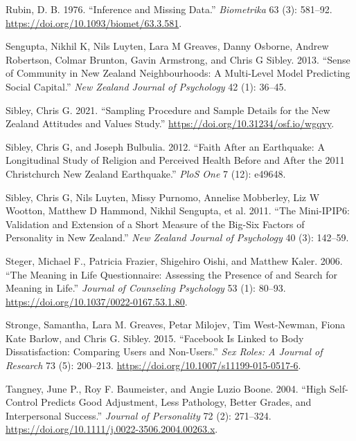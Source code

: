 \documentclass[
  singlecolumn]{report}
\newlength{\cslhangindent}
\newlength{\cslentryspacingunit} %
\newenvironment{CSLReferences}[2] %
 {%
  \setlength{\parindent}{0pt}
  \ifodd #1
  \let\oldpar\par
  \def\par{\hangindent=\cslhangindent\oldpar}
  \fi
  \setlength{\parskip}{#2\cslentryspacingunit}
 }%
 {}
\begin{document}
\begin{CSLReferences}{1}{0}
\leavevmode{}%
Rubin, D. B. 1976. {``Inference and Missing Data.''} \emph{Biometrika}
63 (3): 581--92. \url{https://doi.org/10.1093/biomet/63.3.581}.

\leavevmode{}%
Sengupta, Nikhil K, Nils Luyten, Lara M Greaves, Danny Osborne, Andrew
Robertson, Colmar Brunton, Gavin Armstrong, and Chris G Sibley. 2013.
{``Sense of Community in New Zealand Neighbourhoods: A Multi-Level Model
Predicting Social Capital.''} \emph{New Zealand Journal of Psychology}
42 (1): 36--45.

\leavevmode{}%
Sibley, Chris G. 2021. {``Sampling Procedure and Sample Details for the
New Zealand Attitudes and Values Study.''}
\url{https://doi.org/10.31234/osf.io/wgqvy}.

\leavevmode{}%
Sibley, Chris G, and Joseph Bulbulia. 2012. {``Faith After an
Earthquake: A Longitudinal Study of Religion and Perceived Health Before
and After the 2011 Christchurch New Zealand Earthquake.''} \emph{PloS
One} 7 (12): e49648.

\leavevmode{}%
Sibley, Chris G, Nils Luyten, Missy Purnomo, Annelise Mobberley, Liz W
Wootton, Matthew D Hammond, Nikhil Sengupta, et al. 2011. {``The
Mini-IPIP6: Validation and Extension of a Short Measure of the Big-Six
Factors of Personality in New Zealand.''} \emph{New Zealand Journal of
Psychology} 40 (3): 142--59.

\leavevmode{}%
Steger, Michael F., Patricia Frazier, Shigehiro Oishi, and Matthew
Kaler. 2006. {``The Meaning in Life Questionnaire: Assessing the
Presence of and Search for Meaning in Life.''} \emph{Journal of
Counseling Psychology} 53 (1): 80--93.
\url{https://doi.org/10.1037/0022-0167.53.1.80}.

\leavevmode{}%
Stronge, Samantha, Lara M. Greaves, Petar Milojev, Tim West-Newman,
Fiona Kate Barlow, and Chris G. Sibley. 2015. {``Facebook Is Linked to
Body Dissatisfaction: Comparing Users and Non-Users.''} \emph{Sex Roles:
A Journal of Research} 73 (5): 200--213.
\url{https://doi.org/10.1007/s11199-015-0517-6}.

\leavevmode{}%
Tangney, June P., Roy F. Baumeister, and Angie Luzio Boone. 2004.
{``High Self-Control Predicts Good Adjustment, Less Pathology, Better
Grades, and Interpersonal Success.''} \emph{Journal of Personality} 72
(2): 271--324. \url{https://doi.org/10.1111/j.0022-3506.2004.00263.x}.


\end{CSLReferences}
\end{document}
